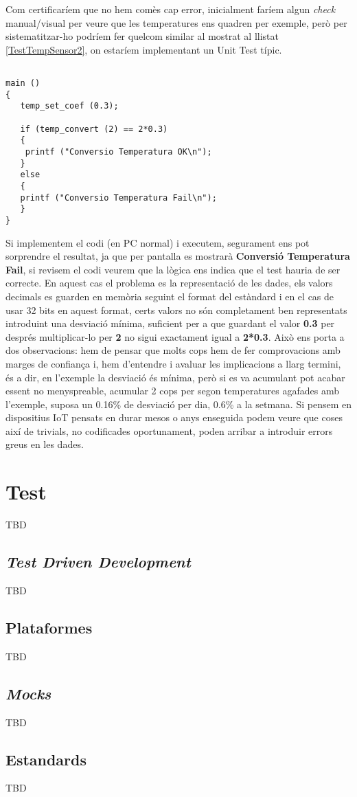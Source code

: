 Com certificaríem que no hem comès cap error, inicialment faríem algun {\em check} manual/visual per veure que les temperatures ens quadren per exemple, però per sistematitzar-ho podríem fer quelcom similar al mostrat al llistat \ref{TestTempSensor2}, on estaríem implementant un Unit Test típic.

\begin{lstlisting}[caption={Test conversió sensor de temperatura},style=customc,label=TestTempSensor2]

main ()
{
   temp_set_coef (0.3);

   if (temp_convert (2) == 2*0.3)
   {
    printf ("Conversio Temperatura OK\n");
   }
   else
   {
   printf ("Conversio Temperatura Fail\n");
   }
}
\end{lstlisting}

Si implementem el codi (en PC normal) i executem, segurament ens pot sorprendre el resultat, ja que per pantalla es mostrarà \textbf{Conversió Temperatura Fail}, si revisem el codi veurem que la lògica ens indica que el test hauria de ser correcte. En aquest cas el problema es la representació de les dades, els valors decimals es guarden en memòria seguint el format del estàndard \cite{IEEE754} i en el cas de usar 32 bits en aquest format, certs valors no són completament ben representats introduint una desviació mínima, suficient per a que guardant el valor \textbf{0.3} per després multiplicar-lo per \textbf{2} no sigui exactament igual a \textbf{2*0.3}. Això ens porta a dos observacions: hem de pensar que molts cops hem de fer comprovacions amb marges de confiança i, hem d'entendre i avaluar les implicacions a llarg termini, és a dir, en l'exemple la desviació és mínima, però si es va acumulant pot acabar essent no menyspreable, acumular 2 cops per segon temperatures agafades amb l'exemple, suposa un 0.16\% de desviació per dia, 0.6\% a la setmana. Si pensem en dispositius \gls{IoT} pensats en durar mesos o anys enseguida podem veure que coses així de trivials, no codificades oportunament, poden arribar a introduir errors greus en les dades.



\chapter{Test}
\label{ch:test_2}
TBD
\section{\em Test Driven Development}
TBD
\section{Plataformes}
TBD
\section{\em Mocks}
TBD
\section{Estandards}
TBD
